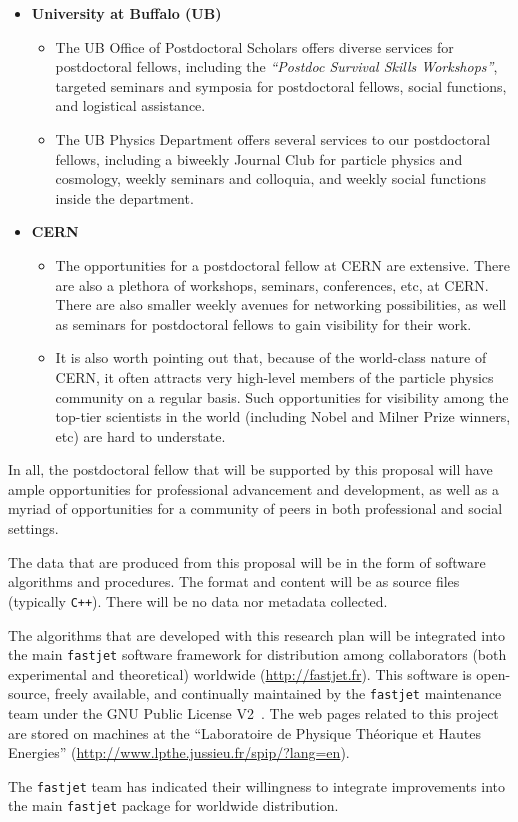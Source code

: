 \documentclass[times,11pt]{article}
\begin{document}
\begin{itemize}
\item {\bf University at Buffalo (UB)}
\begin{itemize}
\item The UB Office of Postdoctoral Scholars offers diverse services
  for postdoctoral fellows, including the {\sl ``Postdoc Survival
    Skills Workshops''}, targeted seminars and symposia for
  postdoctoral fellows, social functions, and logistical assistance. 
\item The UB Physics Department offers several services to our
  postdoctoral fellows, including a biweekly Journal Club for particle
  physics and cosmology, weekly seminars and colloquia, and weekly
  social functions inside the department. 
\end{itemize}
\item {\bf CERN}
\begin{itemize}
\item The opportunities for a postdoctoral fellow at CERN
  are extensive. There are also a plethora of workshops,
  seminars, conferences, etc, at CERN. There are also smaller weekly
  avenues for networking possibilities, as well as seminars for
  postdoctoral fellows to gain visibility for their work. 
\item It is also worth pointing out that, because of the world-class
  nature of CERN, it often attracts very high-level members of the
  particle physics community on a regular basis. Such opportunities
  for visibility among the top-tier scientists in the world (including
  Nobel and Milner Prize winners, etc) are hard to understate. 
\end{itemize}
\end{itemize}

In all, the postdoctoral fellow that will be supported by this
proposal will have ample opportunities for professional advancement
and development, as well as a myriad of opportunities for a community
of peers in both professional and social settings. 



\newpage
{}
\renewcommand{\thepage} {E--\arabic{page}}



The data that are produced from this proposal will be in the form of
software algorithms and procedures. The format and content will be as
source files (typically {\tt C++}). There will be no data nor metadata
collected. 

The algorithms that are developed with this research plan will be
integrated into the main {\tt fastjet} software framework for
distribution among collaborators (both experimental and theoretical)
worldwide (\url{http://fastjet.fr}). This software is open-source,
freely available, and continually maintained by the {\tt fastjet}
maintenance team under the GNU Public License V2~\cite{gnupl}. 
The web pages related to this project are stored on
machines at the ``Laboratoire de Physique Théorique et Hautes Energies'' 
(\url{http://www.lpthe.jussieu.fr/spip/?lang=en}). 

The {\tt fastjet} team has indicated their willingness to integrate
improvements into the main {\tt fastjet} package for worldwide
distribution. 
\end{document}

